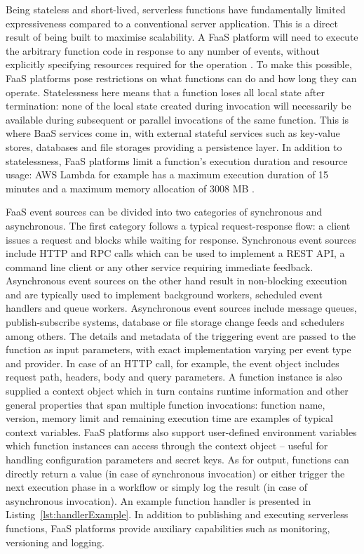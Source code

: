 Being stateless and short-lived, serverless functions have fundamentally limited expressiveness compared to a conventional server application. This is a direct result of being built to maximise scalability. A FaaS platform will need to execute the arbitrary function code in response to any number of events, without explicitly specifying resources required for the operation \parencite{buyya2017manifesto}. To make this possible, FaaS platforms pose restrictions on what functions can do and how long they can operate. Statelessness here means that a function loses all local state after termination: none of the local state created during invocation will necessarily be available during subsequent or parallel invocations of the same function. This is where BaaS services come in, with external stateful services such as key-value stores, databases and file storages providing a persistence layer. In addition to statelessness, FaaS platforms limit a function's execution duration and resource usage: AWS Lambda for example has a maximum execution duration of 15 minutes and a maximum memory allocation of 3008 MB \parencite{awslambda0218}.

FaaS event sources can be divided into two categories of synchronous and asynchronous. The first category follows a typical request-response flow: a client issues a request and blocks while waiting for response. Synchronous event sources include HTTP and RPC calls which can be used to implement a REST API, a command line client or any other service requiring immediate feedback. Asynchronous event sources on the other hand result in non-blocking execution and are typically used to implement background workers, scheduled event handlers and queue workers. Asynchronous event sources include message queues, publish-subscribe systems, database or file storage change feeds and schedulers among others. The details and metadata of the triggering event are passed to the function as input parameters, with exact implementation varying per event type and provider. In case of an HTTP call, for example, the event object includes request path, headers, body and query parameters. A function instance is also supplied a context object which in turn contains runtime information and other general properties that span multiple function invocations: function name, version, memory limit and remaining execution time are examples of typical context variables. FaaS platforms also support user-defined environment variables which function instances can access through the context object -- useful for handling configuration parameters and secret keys. As for output, functions can directly return a value (in case of synchronous invocation) or either trigger the next execution phase in a workflow or simply log the result (in case of asynchronous invocation). An example function handler is presented in Listing~\ref{lst:handlerExample}. In addition to publishing and executing serverless functions, FaaS platforms provide auxiliary capabilities such as monitoring, versioning and logging. \parencite{cncf18serverlessWG}

